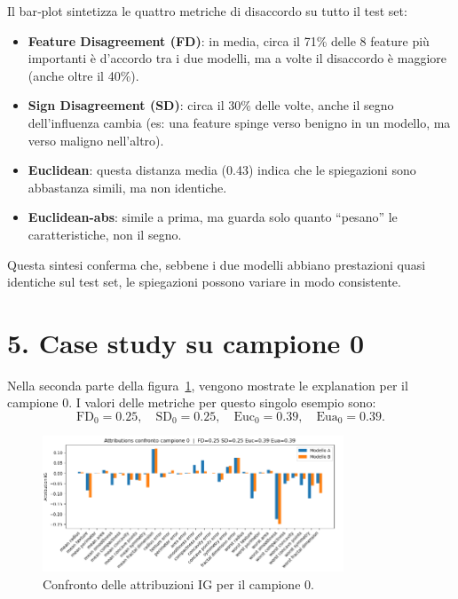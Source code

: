 \documentclass[a4paper,11pt]{article}
\begin{document}
Il bar‐plot sintetizza le quattro metriche di disaccordo su tutto il test set:
\begin{itemize}
    \item \textbf{Feature Disagreement (FD)}: in media, circa il 71\% delle 8 feature più importanti è d’accordo tra i due modelli, ma a volte il disaccordo è maggiore (anche oltre il 40\%).
    \item \textbf{Sign Disagreement (SD)}: circa il 30\% delle volte, anche il segno dell’influenza cambia (es: una feature spinge verso benigno in un modello, ma verso maligno nell’altro).
    \item \textbf{Euclidean}: questa distanza media (0.43) indica che le spiegazioni sono abbastanza simili, ma non identiche.
    \item \textbf{Euclidean-abs}: simile a prima, ma guarda solo quanto “pesano” le caratteristiche, non il segno.
\end{itemize}

Questa sintesi conferma che, sebbene i due modelli abbiano prestazioni quasi identiche sul test set, le spiegazioni possono variare in modo consistente.


\section*{5. Case study su campione 0}
Nella seconda parte della figura~\ref{fig:global_vs_case}, vengono mostrate le explanation per il campione 0. I valori delle metriche per questo singolo esempio sono:
\[
\text{FD}_0 = 0.25,\quad
\text{SD}_0 = 0.25,\quad
\text{Euc}_0 = 0.39,\quad
\text{Eua}_0 = 0.39.
\]

\begin{figure}[htbp]
  \centering
  \includegraphics[width=0.8\textwidth]{campione zero.png}
  \caption{Confronto delle attribuzioni IG per il campione 0.}
  \label{fig:global_vs_case}
\end{figure}
\end{document}
